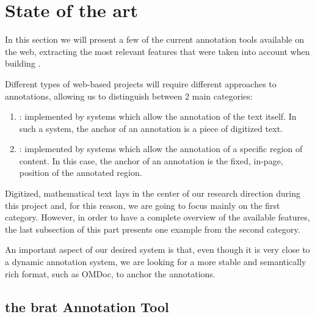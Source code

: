 \section{State of the art}
In this section we will present a few of the current annotation tools available on the
web, extracting the most relevant features that were taken into account when building
\KAT.

Different types of web-based projects will require different approaches to annotations,
allowing us to distinguish between 2 main categories:
\begin{enumerate}
\item {}: implemented by systems which allow the annotation of
  the text itself. In such a system, the anchor of an annotation is a piece of digitized
  text.
\item {}: implemented by systems which allow the annotation of a
  specific region of content. In this case, the anchor of an annotation is the fixed,
  in-page, position of the annotated region.
\end{enumerate}
Digitized, mathematical text lays in the center of our research direction during this
project and, for this reason, we are going to focus mainly on the first category. However,
in order to have a complete overview of the available features, the last subsection of
this part presents one example from the second category.

An important aspect of our desired system is that, even though it is very close to a
dynamic annotation system, we are looking for a more stable and semantically rich format,
such as \textsf{OMDoc}, to anchor the annotations.

\subsection{the brat Annotation Tool}

